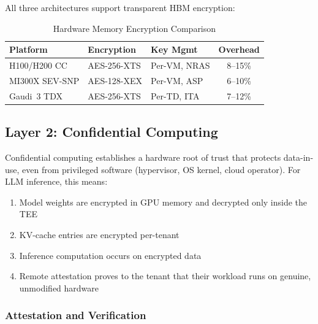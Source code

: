 \documentclass[conference,10pt]{IEEEtran}
\begin{document}
All three architectures support transparent HBM encryption:

\begin{table}[!htbp]
\caption{Hardware Memory Encryption Comparison}
\label{tab:memenc}
\centering\footnotesize
\begin{tabular}{@{}lllc@{}}
\toprule
\textbf{Platform} & \textbf{Encryption} & \textbf{Key Mgmt} & \textbf{Overhead} \\
\midrule
H100/H200 CC & AES-256-XTS & Per-VM, NRAS & 8--15\% \\
MI300X SEV-SNP & AES-128-XEX & Per-VM, ASP & 6--10\% \\
Gaudi~3 TDX & AES-256-XTS & Per-TD, ITA & 7--12\% \\
\bottomrule
\end{tabular}
\end{table}

\subsection{Layer 2: Confidential Computing}

Confidential computing establishes a hardware root of trust that protects data-in-use, even from privileged software (hypervisor, OS kernel, cloud operator). For LLM inference, this means:

\begin{enumerate}
\item Model weights are encrypted in GPU memory and decrypted only inside the TEE
\item KV-cache entries are encrypted per-tenant
\item Inference computation occurs on encrypted data
\item Remote attestation proves to the tenant that their workload runs on genuine, unmodified hardware
\end{enumerate}

\subsubsection{Attestation and Verification}
\end{document}
